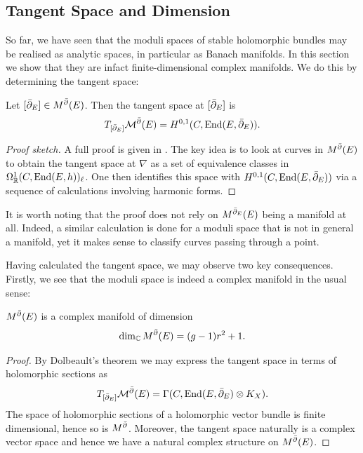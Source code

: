 \documentclass[12pt]{ociamthesis}  %
\begin{document}
\subsection{Tangent Space and Dimension}

So far, we have seen that the moduli spaces of stable holomorphic
bundles may be realised as analytic spaces, in particular as
Banach manifolds. In this section we show that they are infact
finite-dimensional complex manifolds. We do this by determining
the tangent space:

\begin{theorem}
  Let $[\bar{\partial}_E]\in M^{\bar{\partial}}(E)$. Then the tangent space at $[\bar{\partial}_E]$ is
  \begin{align*}
    T_{[\bar{\partial}_E]}\mathcal M^{\bar{\partial}}(E) = H^{0,1}(C,\operatorname{End}(E,\bar{\partial}_E)).
  \end{align*}
  \begin{proof}[Proof sketch]
    A full proof is given in \cite[223-225]{kobayashi1987}. The key idea is to look
    at curves in $M^{\bar{\partial}}(E)$ to obtain the tangent space at $\nabla$ as a set of
    equivalence classes in $\Omega^1_{\mathbb{R}}(C,\operatorname{End}(E,h))_\ell$. One then
    identifies this space with $H^{0,1}(C,\operatorname{End}(E,\bar{\partial}_E))$ via a sequence of calculations
    involving harmonic forms.
  \end{proof}
\end{theorem}

It is worth noting that the proof does not rely on $M^{\bar{\partial}_E}(E)$ being a manifold
at all. Indeed, a similar calculation is done for a moduli space that is not
in general a manifold, yet it makes sense to classify curves passing through a point.

Having calculated the tangent space, we may observe two key consequences.
Firstly, we see that the moduli space is indeed a complex manifold in the usual sense:

\begin{corollary}
  $M^{\bar{\partial}}(E)$ is a complex manifold of dimension
  \begin{align*}
    \dim_{\mathbb{C}} M^{\bar{\partial}}(E) = (g-1)r^2 + 1.
  \end{align*}
  \begin{proof}
    By Dolbeault's theorem we may express the tangent space in terms of holomorphic
    sections as
    \begin{align*}
      T_{[\bar{\partial}_E]}\mathcal M^{\bar{\partial}}(E) = \Gamma(C,\operatorname{End}(E,\bar{\partial}_E) \otimes K_X).
    \end{align*}
    The space of holomorphic sections of a holomorphic vector bundle is finite dimensional,
    hence so is $M^{\bar{\partial}}$. Moreover, the tangent space naturally is a complex vector
    space and hence we have a natural complex structure on $M^{\bar{\partial}}(E)$.

  \end{proof}
\end{corollary}
\end{document}
